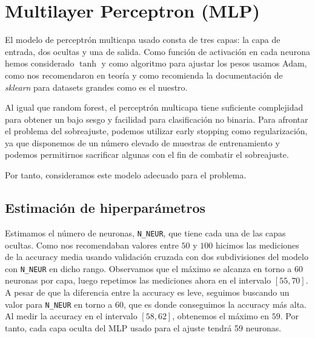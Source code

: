 \documentclass[a4]{article}
\begin{document}
\section{Multilayer Perceptron (MLP)}

El modelo de perceptrón multicapa usado consta de tres capas: la capa de entrada, dos ocultas y una de salida. Como función de activación en cada neurona hemos considerado $\tanh$ y como algoritmo para ajustar los pesos usamos Adam, como nos recomendaron en teoría y como recomienda la documentación de \textit{sklearn} para datasets grandes como es el nuestro.

Al igual que random forest, el perceptrón multicapa tiene suficiente complejidad para obtener un bajo sesgo y facilidad para clasificación no binaria. Para afrontar el problema del sobreajuste, podemos utilizar early stopping como regularización, ya que disponemos de un número elevado de muestras de entrenamiento y podemos permitirnos sacrificar algunas con el fin de combatir el sobreajuste.

Por tanto, consideramos este modelo adecuado para el problema.

\subsection{Estimación de hiperparámetros}

Estimamos el número de neuronas, \texttt{N\_NEUR}, que tiene cada una de las capas ocultas. Como nos recomendaban valores entre $50$ y $100$ hicimos las mediciones de la accuracy media usando validación cruzada con dos subdivisiones del modelo con \texttt{N\_NEUR} en dicho rango. Observamos que el máximo se alcanza en torno a $60$ neuronas por capa, luego repetimos las mediciones ahora en el intervalo $[55,70]$. A pesar de que la diferencia entre la accuracy es leve, seguimos buscando un valor para \texttt{N\_NEUR} en torno a $60$, que es donde conseguimos la accuracy más alta. Al medir la accuracy en el intervalo $[58,62]$, obtenemos el máximo en $59$. Por tanto, cada capa oculta del MLP usado para el ajuste tendrá 59 neuronas.
\end{document}
